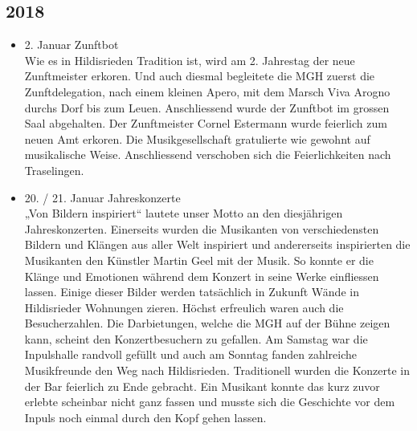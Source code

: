 \subsection*{2018}
\begin{history}

      \begin{itemize}

            \item 2. Januar Zunftbot\\
                  Wie es in Hildisrieden Tradition ist, wird am 2. Jahrestag der
                  neue Zunftmeister erkoren.  Und auch diesmal begleitete die
                  MGH zuerst die Zunftdelegation, nach einem kleinen Apero, mit
                  dem Marsch Viva Arogno durchs Dorf bis zum Leuen.
                  Anschliessend wurde der Zunftbot im grossen Saal abgehalten.
                  Der Zunftmeister Cornel Estermann wurde feierlich zum neuen
                  Amt erkoren. Die Musikgesellschaft gratulierte wie gewohnt auf
                  musikalische Weise. Anschliessend verschoben sich die
                  Feierlichkeiten nach Traselingen.

            \item 20. / 21. Januar Jahreskonzerte\\
                  „Von Bildern inspiriert“ lautete unser Motto an den
                  diesjährigen Jahreskonzerten. Einerseits wurden die Musikanten
                  von verschiedensten Bildern und Klängen aus aller Welt
                  inspiriert und andererseits inspirierten die Musikanten den
                  Künstler Martin Geel mit der Musik. So konnte er die Klänge
                  und Emotionen während dem Konzert in seine Werke einfliessen
                  lassen. Einige dieser Bilder werden tatsächlich in Zukunft
                  Wände in Hildisrieder Wohnungen zieren. Höchst erfreulich
                  waren auch die Besucherzahlen. Die Darbietungen, welche die
                  MGH auf der Bühne zeigen kann, scheint den Konzertbesuchern zu
                  gefallen. Am Samstag war die Inpulshalle randvoll gefüllt und
                  auch am Sonntag fanden zahlreiche Musikfreunde den Weg nach
                  Hildisrieden. Traditionell wurden die Konzerte in der Bar
                  feierlich zu Ende gebracht. Ein Musikant konnte das kurz zuvor
                  erlebte scheinbar nicht ganz fassen und musste sich die
                  Geschichte vor dem Inpuls noch einmal durch den Kopf gehen
                  lassen.


\end{itemize}
\end{history}

